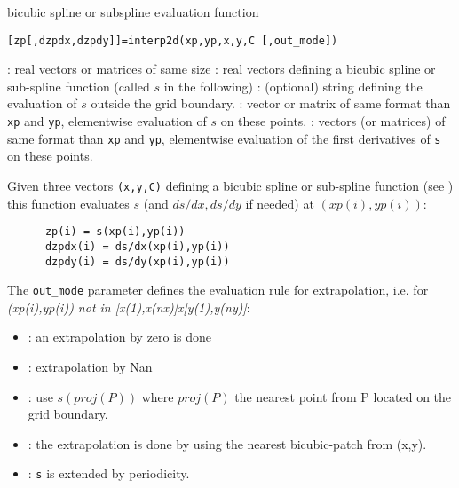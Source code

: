 

\begin{mandesc}
 {bicubic spline or subspline evaluation function}
\end{mandesc}

\begin{calling_sequence}
\begin{verbatim}
[zp[,dzpdx,dzpdy]]=interp2d(xp,yp,x,y,C [,out_mode])
\end{verbatim}
\end{calling_sequence}


\begin{parameters}
  \begin{varlist}
   : real vectors or matrices of same size
   : real vectors defining a bicubic spline or sub-spline function 
                (called $s$ in the following)
   : (optional) string defining the evaluation of $s$ outside 
                the grid boundary.
   : vector or matrix of same format than \verb!xp! and \verb!yp!, elementwise 
                evaluation of $s$ on these points.
   : vectors (or matrices) of same format than \verb!xp! and \verb!yp!, elementwise
                evaluation of the first derivatives of \verb!s! on these points.
  \end{varlist}
\end{parameters}

\begin{mandescription}
  Given three vectors \verb!(x,y,C)! defining a bicubic spline or sub-spline function
  (see  ) this function evaluates $s$ 
  (and $ds/dx, ds/dy$ if needed) at $(xp(i),yp(i))$:
    \begin{verbatim}
      zp(i) = s(xp(i),yp(i))   
      dzpdx(i) = ds/dx(xp(i),yp(i))
      dzpdy(i) = ds/dy(xp(i),yp(i))  
    \end{verbatim}

  The \verb!out_mode! parameter defines the evaluation rule for extrapolation,
  i.e. for {\em (xp(i),yp(i)) not in [x(1),x(nx)]x[y(1),y(ny)]}: 
  \begin{itemize}
       \item {}: an extrapolation by zero is done
       \item {}: extrapolation by Nan
       \item {}:  use $s(proj(P))$ where $proj(P)$ the nearest point from P located on the grid boundary.
        \item {}: the extrapolation is done by using the nearest bicubic-patch from (x,y).
       \item {}: \verb!s! is extended by periodicity. 
  \end{itemize}

\end{mandescription}

